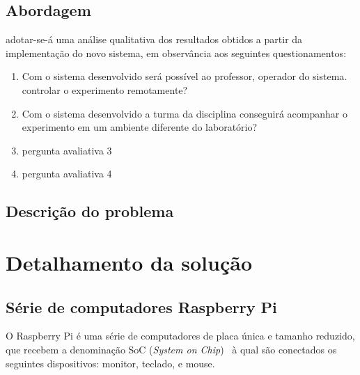 \documentclass[12pt,a4paper,oneside]{book}
\begin{document}
\section{Abordagem}
adotar-se-á uma análise qualitativa dos resultados obtidos a partir da implementação do novo sistema, em observância aos seguintes questionamentos:
\begin{enumerate}
    \item Com o sistema desenvolvido será possível ao professor, operador do sistema. controlar o experimento remotamente?
    \item Com o sistema desenvolvido a turma da disciplina conseguirá acompanhar o experimento em um ambiente diferente do laboratório?
    \item pergunta avaliativa 3
    \item pergunta avaliativa 4
\end{enumerate}
%
%

\section{Descrição do problema}


%
\chapter{Detalhamento da solução}
%
\thispagestyle{empty} 
%


\section {Série de computadores Raspberry Pi}
%
O Raspberry Pi é uma série de computadores de placa única e tamanho reduzido, que recebem a denominação  SoC (\textit{System on Chip})~\cite{url:soc} à qual são conectados os seguintes dispositivos: monitor, teclado, e mouse. 
\end{document}
